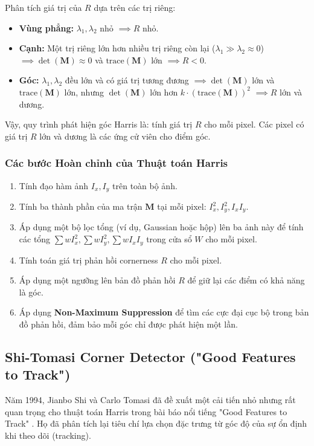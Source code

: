 Phân tích giá trị của $R$ dựa trên các trị riêng:
\begin{itemize}
    \item \textbf{Vùng phẳng:} $\lambda_1, \lambda_2$ nhỏ $\implies R$ nhỏ.
    \item \textbf{Cạnh:} Một trị riêng lớn hơn nhiều trị riêng còn lại ($\lambda_1 \gg \lambda_2 \approx 0$) $\implies \det(\mathbf{M}) \approx 0$ và $\text{trace}(\mathbf{M})$ lớn $\implies R < 0$.
    \item \textbf{Góc:} $\lambda_1, \lambda_2$ đều lớn và có giá trị tương đương $\implies \det(\mathbf{M})$ lớn và $\text{trace}(\mathbf{M})$ lớn, nhưng $\det(\mathbf{M})$ lớn hơn $k \cdot (\text{trace}(\mathbf{M}))^2$ $\implies R$ lớn và dương.
\end{itemize}

Vậy, quy trình phát hiện góc Harris là: tính giá trị $R$ cho mỗi pixel. Các pixel có giá trị $R$ lớn và dương là các ứng cử viên cho điểm góc.

\subsubsection{Các bước Hoàn chỉnh của Thuật toán Harris}
\label{subsubsec:harris_full_algorithm}
\begin{enumerate}
    \item Tính đạo hàm ảnh $I_x, I_y$ trên toàn bộ ảnh.
    \item Tính ba thành phần của ma trận $\mathbf{M}$ tại mỗi pixel: $I_x^2, I_y^2, I_x I_y$.
    \item Áp dụng một bộ lọc tổng (ví dụ, Gaussian hoặc hộp) lên ba ảnh này để tính các tổng $\sum wI_x^2, \sum wI_y^2, \sum wI_x I_y$ trong cửa sổ $W$ cho mỗi pixel.
    \item Tính toán giá trị phản hồi cornerness $R$ cho mỗi pixel.
    \item Áp dụng một ngưỡng lên bản đồ phản hồi $R$ để giữ lại các điểm có khả năng là góc.
    \item Áp dụng \textbf{Non-Maximum Suppression} để tìm các cực đại cục bộ trong bản đồ phản hồi, đảm bảo mỗi góc chỉ được phát hiện một lần.
\end{enumerate}

\subsection{Shi-Tomasi Corner Detector ("Good Features to Track")}
\label{subsec:shi_tomasi}

Năm 1994, Jianbo Shi và Carlo Tomasi đã đề xuất một cải tiến nhỏ nhưng rất quan trọng cho thuật toán Harris trong bài báo nổi tiếng "Good Features to Track" \cite{Shi1994}. Họ đã phân tích lại tiêu chí lựa chọn đặc trưng từ góc độ của sự ổn định khi theo dõi (tracking).


